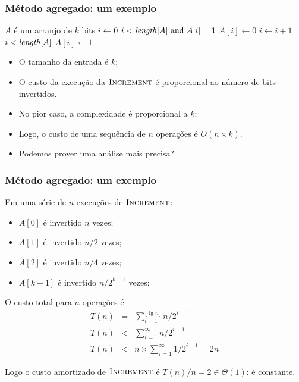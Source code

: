 \documentclass{beamer}
\begin{document}
\begin{frame}

\frametitle{Método agregado: um exemplo}

  \begin{codebox}
    \zi \Comment $A$ é um arranjo de $k$ bits
    \li $i \gets 0$
    \li \While $i < \id{length}[A] \mbox{ and } A[i] = 1$
    \li \Do $A[i] \gets 0$
    \li   $i \gets i + 1$
        \End
    \li \If $i < \id{length}[A]$
    \li \Then $A[i] \gets 1$
        \End
  \end{codebox}

\begin{itemize}
\item O tamanho da entrada é $k$;
\item O custo da execução da $\textnormal{\scshape Increment}$ é proporcional ao número de bits
  invertidos.
\item No pior caso, a complexidade é proporcional a $k$;
\item Logo, o custo de uma sequência de $n$ operações é $O(n \times k)$.
\item Podemos prover uma análise mais precisa?
\end{itemize}

\end{frame}

\begin{frame}

\frametitle{Método agregado: um exemplo}

Em uma série de $n$ execuções de $\textnormal{\scshape Increment}$:
\begin{itemize}
\item $A[0]$ é invertido $n$ vezes;
\item $A[1]$ é invertido $n/2$ vezes;
\item $A[2]$ é invertido $n/4$ vezes;
\item $A[k-1]$ é invertido $n/2^{k-1}$ vezes;
\end{itemize}
O custo total para $n$ operações é 
\begin{eqnarray*}
T(n) & = & \sum_{i=1}^{\lfloor \lg n \rfloor} n/2^{i-1} \\
T(n) & < & \sum_{i=1}^{\infty} n/2^{i-1} \\
T(n) & < & n \times \sum_{i=1}^{\infty} 1/2^{i-1} = 2n
\end{eqnarray*}

Logo o custo amortizado de $\textnormal{\scshape Increment}$ é $T(n)/n = 2 \in \Theta(1)$: é \alert{constante}.

\end{frame}
\end{document}
